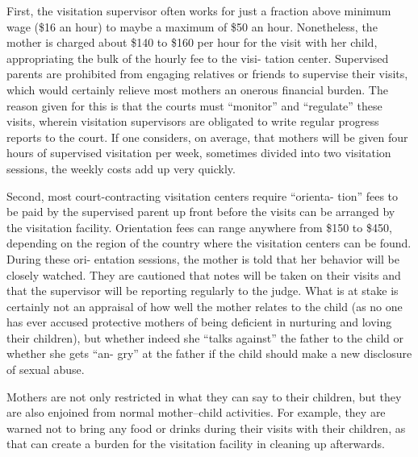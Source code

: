 First, the visitation supervisor often works for just a fraction above
minimum wage (\$16 an hour) to maybe a maximum of \$50 an hour.
Nonetheless, the mother is charged about \$140 to \$160 per hour for the
visit with her child, appropriating the bulk of the hourly fee to the visi-
tation center. Supervised parents are prohibited from engaging relatives
or friends to supervise their visits, which would certainly relieve most
mothers an onerous financial burden. The reason given for this is that
the courts must “monitor” and “regulate” these visits, wherein visitation
supervisors are obligated to write regular progress reports to the court.
If one considers, on average, that mothers will be given four hours of
supervised visitation per week, sometimes divided into two visitation
sessions, the weekly costs add up very quickly. \pfl{}


Second, most court-contracting visitation centers require “orienta-
tion” fees to be paid by the supervised parent up front before the
visits can be arranged by the visitation facility. Orientation fees can
range anywhere from \$150 to \$450, depending on the region of the
country where the visitation centers can be found. During these ori-
entation sessions, the mother is told that her behavior will be closely
watched. They are cautioned that notes will be taken on their visits
and that the supervisor will be reporting regularly to the judge. What
is at stake is certainly not an appraisal of how well the mother relates
to the child (as no one has ever accused protective mothers of being
deficient in nurturing and loving their children), but whether indeed
she “talks against” the father to the child or whether she gets “an-
gry” at the father if the child should make a new disclosure of sexual
abuse. \pfl{}



Mothers are not only restricted in what they can say to their children,
but they are also enjoined from normal mother–child activities. For
example, they are warned not to bring any food or drinks during their
visits with their children, as that can create a burden for the visitation
facility in cleaning up afterwards. \pfl{}


